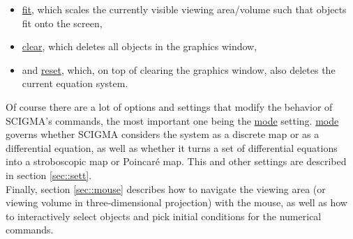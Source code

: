 \documentclass[10pt,a4paper,titlepage]{article}
\newcommand{\HL}[1]{\hyperlink{#1}{#1}}
\begin{document}
\begin{itemize}
\item{\HL{fit}, which scales the currently visible viewing area/volume such that objects fit onto the screen,}
\item{\HL{clear}, which deletes all objects in the graphics window,}
\item{and \HL{reset}, which, on top of clearing the graphics window, also deletes the current equation system.}
\end{itemize}
Of course there are a lot of options and settings that modify the behavior of SCIGMA's commands, the most important one being the \HL{mode} setting. \HL{mode} governs whether SCIGMA considers the system as a discrete map or as a differential equation, as well as whether it turns a set of differential equations into a stroboscopic map or Poincar\'e map. This and other settings are described in section \ref{sec::sett}.\\
Finally, section \ref{sec::mouse} describes how to navigate the viewing area (or viewing volume in three-dimensional projection) with the mouse, as well as how to interactively select objects and pick initial conditions for the numerical commands.
\end{document}
